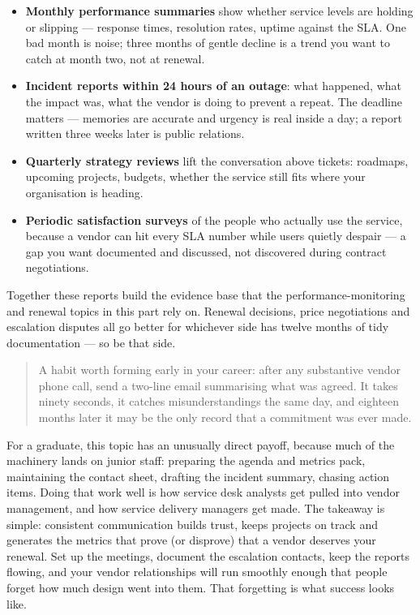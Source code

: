 \begin{itemize}[leftmargin=*]
\item \textbf{Monthly performance summaries} show whether service levels are holding or slipping — response times, resolution rates, uptime against the SLA. One bad month is noise; three months of gentle decline is a trend you want to catch at month two, not at renewal.
\item \textbf{Incident reports within 24 hours of an outage}: what happened, what the impact was, what the vendor is doing to prevent a repeat. The deadline matters — memories are accurate and urgency is real inside a day; a report written three weeks later is public relations.
\item \textbf{Quarterly strategy reviews} lift the conversation above tickets: roadmaps, upcoming projects, budgets, whether the service still fits where your organisation is heading.
\item \textbf{Periodic satisfaction surveys} of the people who actually use the service, because a vendor can hit every SLA number while users quietly despair — a gap you want documented and discussed, not discovered during contract negotiations.
\end{itemize}

Together these reports build the evidence base that the performance-monitoring and renewal topics in this part rely on. Renewal decisions, price negotiations and escalation disputes all go better for whichever side has twelve months of tidy documentation — so be that side.



\begin{quote}\small
A habit worth forming early in your career: after any substantive vendor phone call, send a two-line email summarising what was agreed. It takes ninety seconds, it catches misunderstandings the same day, and eighteen months later it may be the only record that a commitment was ever made.
\end{quote}


For a graduate, this topic has an unusually direct payoff, because much of the machinery lands on junior staff: preparing the agenda and metrics pack, maintaining the contact sheet, drafting the incident summary, chasing action items. Doing that work well is how service desk analysts get pulled into vendor management, and how service delivery managers get made. The takeaway is simple: consistent communication builds trust, keeps projects on track and generates the metrics that prove (or disprove) that a vendor deserves your renewal. Set up the meetings, document the escalation contacts, keep the reports flowing, and your vendor relationships will run smoothly enough that people forget how much design went into them. That forgetting is what success looks like.

